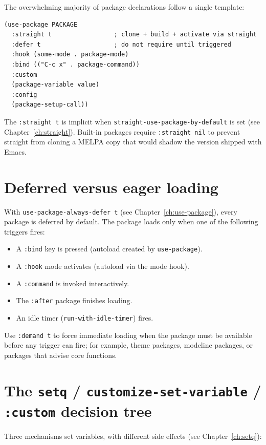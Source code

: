 The overwhelming majority of package declarations follow a single template:

\begin{verbatim}
(use-package PACKAGE
  :straight t                 ; clone + build + activate via straight
  :defer t                    ; do not require until triggered
  :hook (some-mode . package-mode)
  :bind (("C-c x" . package-command))
  :custom
  (package-variable value)
  :config
  (package-setup-call))
\end{verbatim}

The \texttt{:straight t} is implicit when \texttt{straight-use-package-by-default} is set (see Chapter~\ref{ch:straight}).  Built-in packages require \texttt{:straight nil} to prevent straight from cloning a MELPA copy that would shadow the version shipped with Emacs.

\section{Deferred versus eager loading}

With \texttt{use-package-always-defer t} (see Chapter~\ref{ch:use-package}), every package is deferred by default.  The package loads only when one of the following triggers fires:

\begin{itemize}
  \item A \texttt{:bind} key is pressed (autoload created by \texttt{use-package}).
  \item A \texttt{:hook} mode activates (autoload via the mode hook).
  \item A \texttt{:command} is invoked interactively.
  \item The \texttt{:after} package finishes loading.
  \item An idle timer (\texttt{run-with-idle-timer}) fires.
\end{itemize}

Use \texttt{:demand t} to force immediate loading when the package must be available before any trigger can fire; for example, theme packages, modeline packages, or packages that advise core functions.

\section{The \texttt{setq} / \texttt{customize-set-variable} / \texttt{:custom} decision tree}

Three mechanisms set variables, with different side effects (see Chapter~\ref{ch:setq}):

